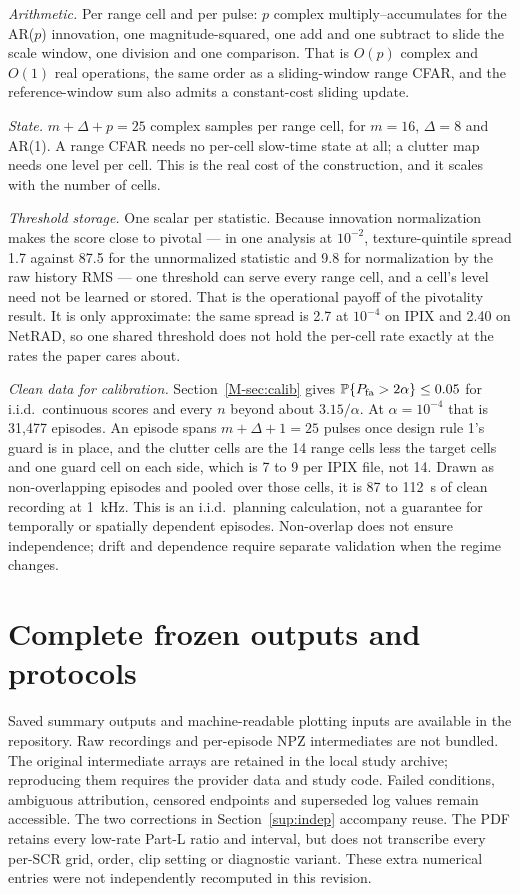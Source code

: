 \documentclass[10pt]{article}
\newcommand{\PP}{\mathbb{P}}
\begin{document}
\emph{Arithmetic.} Per range cell and per pulse: $p$ complex multiply--accumulates for the
AR($p$) innovation, one magnitude-squared, one add and one subtract to slide the scale window,
one division and one comparison. That is $O(p)$ complex and $O(1)$ real operations, the same
order as a sliding-window range CFAR, and the reference-window sum also admits a constant-cost sliding update.

\emph{State.} $m+\Delta+p=25$ complex samples per range cell, for $m=16$, $\Delta=8$ and
AR(1). A range CFAR needs no per-cell slow-time state at all; a clutter map needs one level per
cell. This is the real cost of the construction, and it scales with the number of cells.

\emph{Threshold storage.} One scalar per statistic. Because innovation normalization makes the
score close to pivotal --- in one analysis at $10^{-2}$, texture-quintile spread 1.7 against
87.5 for the unnormalized statistic and 9.8 for normalization by the raw history RMS --- one
threshold can serve every range cell, and a cell's level need not be learned or stored. That is
the operational payoff of the pivotality result. It is only approximate: the same spread is 2.7
at $10^{-4}$ on IPIX and 2.40 on NetRAD, so one shared threshold does not hold the per-cell
rate exactly at the rates the paper cares about.

\emph{Clean data for calibration.} Section~\ref{M-sec:calib} gives
$\PP\{P_{\rm fa}>2\alpha\}\le0.05$ for i.i.d.\ continuous scores and every $n$ beyond about $3.15/\alpha$. At
$\alpha=10^{-4}$ that is 31{,}477 episodes. An episode spans $m+\Delta+1=25$ pulses
once design rule 1's guard is in place, and the clutter cells are the 14 range cells less the
target cells and one guard cell on each side, which is 7 to 9 per IPIX
file, not 14. Drawn as non-overlapping episodes and pooled over those cells, it is
87 to 112~s of clean recording at 1~kHz. This is an i.i.d.\ planning
calculation, not a guarantee for temporally or spatially dependent episodes. Non-overlap does
not ensure independence; drift and dependence require separate validation when the regime changes.


\section{Complete frozen outputs and protocols}\label{sup:repository}
Saved summary outputs and machine-readable plotting inputs are available in the repository. Raw recordings and per-episode NPZ intermediates are not bundled. The original intermediate arrays are retained in the local study archive; reproducing them requires the provider data and study code. Failed conditions, ambiguous attribution, censored endpoints and superseded log values remain accessible. The two corrections in Section~\ref{sup:indep} accompany reuse. The PDF retains every low-rate Part-L ratio and interval, but does not transcribe every per-SCR grid, order, clip setting or diagnostic variant. These extra numerical entries were not independently recomputed in this revision.
\end{document}

